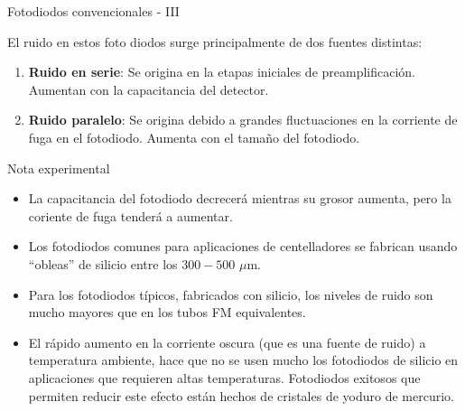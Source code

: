 \documentclass[a4paper,10pt]{beamer}
\begin{document}
\begin{frame}{Fotodiodos convencionales - III}
 
 El ruido en estos foto diodos surge principalmente de dos fuentes distintas:
 
 \begin{enumerate}
  \item \begin{justify}
	  \textbf{Ruido en serie}: Se origina en la etapas iniciales de 
	  preamplificación. Aumentan con la capacitancia del detector.
	\end{justify}
  \item \begin{justify}
         \textbf{Ruido paralelo}: Se origina debido a grandes fluctuaciones en 
         la corriente de fuga en el fotodiodo. Aumenta con el tamaño del fotodiodo.
        \end{justify}
 \end{enumerate}
 
 \begin{exampleblock}{Nota experimental}
  \begin{itemize}[<+->]
   \item \begin{justify}
          La capacitancia del fotodiodo decrecerá mientras su grosor aumenta, pero 
          la coriente de fuga tenderá a aumentar.
         \end{justify}
   \item \begin{justify}
          Los fotodiodos comunes para aplicaciones de centelladores se fabrican usando 
          ``obleas'' de silicio entre los $300-500$ $\mu$m.
         \end{justify}
   \item \begin{justify}
          Para los fotodiodos típicos, fabricados con silicio, los niveles de ruido 
          son mucho mayores que en los tubos FM equivalentes.
         \end{justify}      
   \item \begin{justify}
          El rápido aumento en la corriente oscura (que es una fuente de ruido) 
          a temperatura ambiente, hace que no se usen mucho los fotodiodos de silicio
          en aplicaciones que requieren altas temperaturas. Fotodiodos exitosos 
          que permiten reducir este efecto están hechos de cristales de yoduro de 
          mercurio.
         \end{justify}
  \end{itemize}

 \end{exampleblock}

\end{frame}
\end{document}
